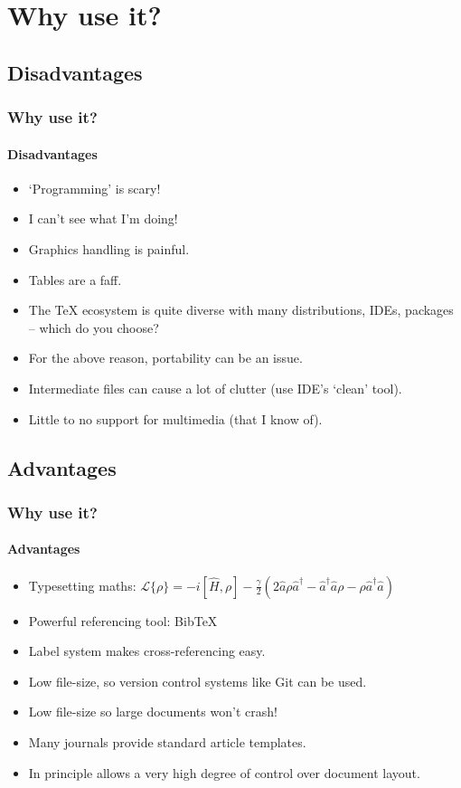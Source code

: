 \documentclass{beamer}
\begin{document}
\section{Why use it?}

\subsection[Cons]{Disadvantages}
\begin{frame}
\frametitle{Why use it?}
\framesubtitle{Disadvantages}

\begin{itemize}
\item `Programming' is scary!
\item I can't see what I'm doing!
\item Graphics handling is painful.
\item Tables are a faff.
\item The TeX ecosystem is quite diverse with many distributions, IDEs, packages -- which do you choose?
\item For the above reason, portability can be an issue.
\item Intermediate files can cause a lot of clutter (use IDE's `clean' tool).
\item Little to no support for multimedia (that I know of).
\end{itemize}
\end{frame}

\subsection[Pros]{Advantages}
\begin{frame}
\frametitle{Why use it?}
\framesubtitle{Advantages}

\begin{itemize}
\item Typesetting maths: \(\mathcal{L}\{\rho\} = -i[\hat{H}, \rho] - \frac{\gamma}{2}\left(2 \hat{a}\rho\hat{a}^{\dagger} - \hat{a}^{\dagger}\hat{a}\rho - \rho\hat{a}^{\dagger}\hat{a}\right)\)
\item Powerful referencing tool: BibTeX
\item Label system makes cross-referencing easy.
\item Low file-size, so version control systems like Git can be used.
\item Low file-size so large documents won't crash!
\item Many journals provide standard article templates.
\item In principle allows a very high degree of control over document layout.
\end{itemize}
\end{frame}
\end{document}
